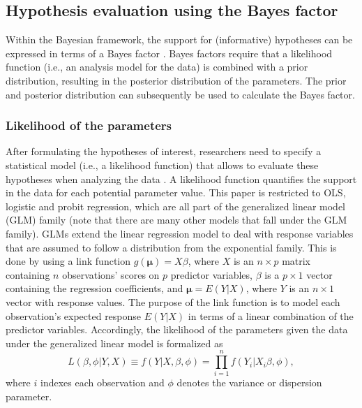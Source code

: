 \documentclass[
  authoryear,
  preprint,
  5p,
  twocolumn]{elsarticle}
\begin{document}
\hypertarget{hypothesis-evaluation-using-the-bayes-factor}{%
\subsection{Hypothesis evaluation using the Bayes
factor}\label{hypothesis-evaluation-using-the-bayes-factor}}

Within the Bayesian framework, the support for (informative) hypotheses
can be expressed in terms of a Bayes factor
\citep{kass_raftery_bayes_factors_1995}. Bayes factors require that a
likelihood function (i.e., an analysis model for the data) is combined
with a prior distribution, resulting in the posterior distribution of
the parameters. The prior and posterior distribution can subsequently be
used to calculate the Bayes factor.

\hypertarget{likelihood-of-the-parameters}{%
\subsubsection{Likelihood of the
parameters}\label{likelihood-of-the-parameters}}

After formulating the hypotheses of interest, researchers need to
specify a statistical model (i.e., a likelihood function) that allows to
evaluate these hypotheses when analyzing the data
\citep{lynch_introduction_2007}. A likelihood function quantifies the
support in the data for each potential parameter value. This paper is
restricted to OLS, logistic and probit regression, which are all part of
the generalized linear model (GLM) family (note that there are many
other models that fall under the GLM family). GLMs extend the linear
regression model to deal with response variables that are assumed to
follow a distribution from the exponential family. This is done by using
a link function \(g(\boldsymbol{\mu}) = X\beta\), where \(X\) is an
\(n \times p\) matrix containing \(n\) observations' scores on \(p\)
predictor variables, \(\beta\) is a \(p \times 1\) vector containing the
regression coefficients, and \(\boldsymbol{\mu} = E(Y|X)\), where \(Y\)
is an \(n \times 1\) vector with response values. The purpose of the
link function is to model each observation's expected response
\(E(Y|X)\) in terms of a linear combination of the predictor variables.
Accordingly, the likelihood of the parameters given the data under the
generalized linear model is formalized as \[
L(\beta, \phi|Y, X) \equiv f(Y|X, \beta, \phi) = \prod^n_{i=1} f(Y_i|X_i \beta, \phi),
\] where \(i\) indexes each observation and \(\phi\) denotes the
variance or dispersion parameter.
\end{document}
